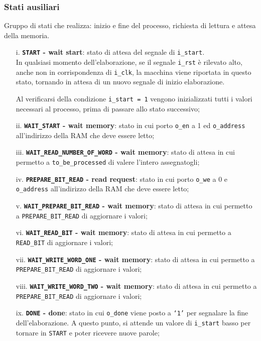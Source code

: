 \documentclass{article}
\begin{document}
\subsubsection{Stati ausiliari} %
Gruppo di stati che realizza: inizio e fine del processo, richiesta di lettura e attesa della memoria.
\begin{itemize}
    \item [i.]     \textbf{\texttt{START} - wait start}: stato di attesa del segnale di \texttt{i\_start}. \\
          In qualsiasi momento dell’elaborazione, se il segnale \texttt{i\_rst} è rilevato alto\footnotemark, anche non in corrispondenza di \texttt{i\_clk}, la macchina viene riportata in questo stato, tornando in attesa di un nuovo segnale di inizio elaborazione.\par
          Al verificarsi della condizione \texttt{i\_start = 1} vengono inizializzati tutti i valori necessari al processo, prima di passare allo stato successivo;
    \item [ii.]    \textbf{\texttt{WAIT\_START} - wait memory}: stato in cui porto \texttt{o\_en} a 1 ed \texttt{o\_address} all’indirizzo della RAM che deve essere letto;
    \item [iii.]    \textbf{\texttt{WAIT\_READ\_NUMBER\_OF\_WORD} - wait memory}: stato di attesa in cui permetto a \texttt{to\_be\_processed} di valere l'intero assegnatogli;
    \item [iv.]     \textbf{\texttt{PREPARE\_BIT\_READ} - read request}: stato in cui porto \texttt{o\_we} a 0 e \texttt{o\_address} all’indirizzo della RAM che deve essere letto;
    \item [v.]     \textbf{\texttt{WAIT\_PREPARE\_BIT\_READ} - wait memory}: stato di attesa in cui permetto a \texttt{PREPARE\_BIT\_READ} di aggiornare i valori;
    \item [vi.]    \textbf{\texttt{WAIT\_READ\_BIT} - wait memory}: stato di attesa in cui permetto a \texttt{READ\_BIT} di aggiornare i valori;
    \item [vii.]    \textbf{\texttt{WAIT\_WRITE\_WORD\_ONE} - wait memory}: stato di attesa in cui permetto a \texttt{PREPARE\_BIT\_READ} di aggiornare i valori;
    \item [viii.]    \textbf{\texttt{WAIT\_WRITE\_WORD\_TWO} - wait memory}: stato di attesa in cui permetto a \texttt{PREPARE\_BIT\_READ} di aggiornare i valori;
    \item [ix.]      \textbf{\texttt{DONE} - done}: stato in cui \texttt{o\_done} viene posto a \texttt{‘1’} per segnalare la fine dell’elaborazione. A questo punto, si attende un valore di \texttt{i\_start} basso per tornare in \texttt{START} e poter ricevere nuove parole;
\end{itemize}
\end{document}
